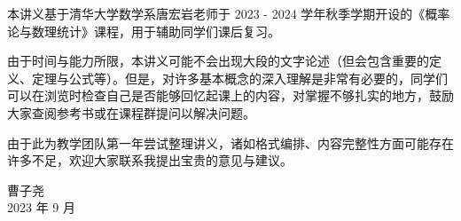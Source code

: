 \documentclass[main.tex]{subfiles}
\begin{document}
本讲义基于清华大学数学系唐宏岩老师于 2023 - 2024 学年秋季学期开设的《概率论与数理统计》课程，用于辅助同学们课后复习。

由于时间与能力所限，本讲义可能不会出现大段的文字论述（但会包含重要的定义、定理与公式等）。但是，对许多基本概念的深入理解是非常有必要的，同学们可以在浏览时检查自己是否能够回忆起课上的内容，对掌握不够扎实的地方，鼓励大家查阅参考书或在课程群提问以解决问题。

由于此为教学团队第一年尝试整理讲义，诸如格式编排、内容完整性方面可能存在许多不足，欢迎大家联系我提出宝贵的意见与建议。

\begin{flushright}
    曹子尧\\
    2023 年 9 月
\end{flushright}
\end{document}
